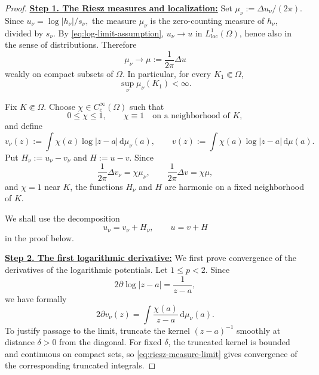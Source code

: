 \documentclass[12pt,letterpaper,reqno]{amsart}
\theoremstyle{definition}
\numberwithin{equation}{section}
\newcommand{\loc}{\mathrm{loc}}
\begin{document}
\begin{proof}

\medskip\noindent
\textbf{\underline{Step 1. The Riesz measures and localization:}}
Set $
\mu_\nu:=\Delta u_\nu/(2\pi).$
Since
$
u_\nu=\log|h_\nu|/{s_\nu},
$
the measure \(\mu_\nu\) is the zero-counting measure of \(h_\nu\),
divided by \(s_\nu\). By \eqref{eq:log-limit-assumption},
\(u_\nu\to u\) in \(L^1_{\loc}(\Omega)\), hence also in the sense of
distributions. Therefore
\begin{equation}\label{eq:riesz-measure-limit}
 \mu_\nu\longrightarrow
 \mu:=\frac1{2\pi}\Delta u
\end{equation}
weakly on compact subsets of \(\Omega\). In particular, for every
\(K_1\Subset\Omega\),
\begin{equation}\label{eq:riesz-mass-bound}
 \sup_\nu \mu_\nu(K_1)<\infty.
\end{equation}

Fix \(K\Subset\Omega\). Choose
\(\chi\in C_c^\infty(\Omega)\) such that
\[
0\leq\chi\leq1,
\qquad
\chi\equiv1
\quad\text{on a neighborhood of }K,
\]
and define
\begin{equation}\label{eq:localized-potentials}
 v_\nu(z)
 :=
 \int\chi(a)\log|z-a|\,\mathrm d\mu_\nu(a),
 \qquad
 v(z)
 :=
 \int\chi(a)\log|z-a|\,\mathrm d\mu(a).
\end{equation}
Put
$
H_\nu:=u_\nu-v_\nu$
and $
H:=u-v.
$
Since
\[
\frac1{2\pi}\Delta v_\nu=\chi\mu_\nu,
\qquad
\frac1{2\pi}\Delta v=\chi\mu,
\]
and \(\chi=1\) near \(K\), the functions \(H_\nu\) and \(H\) are
harmonic on a fixed neighborhood of \(K\).

We shall use the decomposition
\begin{equation}\label{eq:potential-harmonic-decomposition}
 u_\nu=v_\nu+H_\nu,
 \qquad
 u=v+H
\end{equation}
in the proof below.

\medskip\noindent
\textbf{\underline{Step 2. The first logarithmic derivative:}}
We first prove convergence of the derivatives of the logarithmic
potentials. Let \(1\leq p<2\). Since
\[
2\partial\log|z-a|=\frac1{z-a},
\]
we have formally
\[
2\partial v_\nu(z)
 =
 \int\frac{\chi(a)}{z-a}\,\mathrm d\mu_\nu(a).
\]
To justify passage to the limit, truncate the kernel
\((z-a)^{-1}\) smoothly at distance \(\delta>0\) from the diagonal.
For fixed \(\delta\), the truncated kernel is bounded and continuous
on compact sets, so \eqref{eq:riesz-measure-limit} gives convergence
of the corresponding truncated integrals.


\end{proof}
\end{document}
